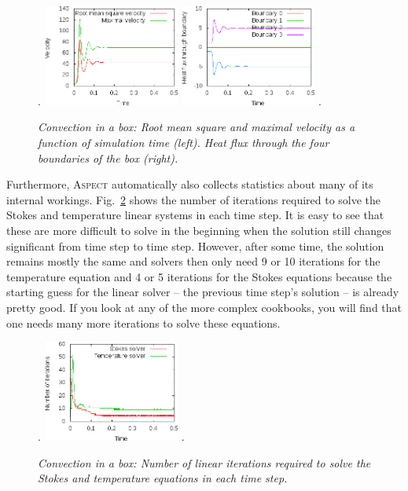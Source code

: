 \documentclass{article}
\newcommand{\aspect}{\textsc{Aspect}}
\begin{document}
\begin{figure}
\phantom.
\hfill
\includegraphics[width=0.4\textwidth]{cookbooks/convection-box/velocity}
\hfill
\includegraphics[width=0.4\textwidth]{cookbooks/convection-box/heatflux}
\hfill
\phantom.
\caption{\it Convection in a box: Root mean square and maximal velocity as a
function of simulation time (left). Heat flux through the four boundaries of
the box (right).}
\label{fig:convection-box-stats}
\end{figure}


Furthermore, \aspect{} automatically also collects statistics about many of its
internal workings. Fig.~\ref{fig:convection-box-iterations} shows the number of
iterations required to solve the Stokes and temperature linear systems in each
time step. It is easy to see that these are more difficult to solve in the
beginning when the solution still changes significant from time step to time
step. However, after some time, the solution remains mostly the same and solvers
then only need 9 or 10 iterations for the temperature equation and 4 or 5
iterations for the Stokes equations because the starting guess for the linear
solver -- the previous time step's solution -- is already pretty good. If you
look at any of the more complex cookbooks, you will find that one needs many
more iterations to solve these equations.

\begin{figure}
\phantom.
\hfill
\includegraphics[width=0.4\textwidth]{cookbooks/convection-box/iterations}
\hfill
\phantom.
\caption{\it Convection in a box: Number of linear iterations required to solve
the Stokes and temperature equations in each time step.}
\label{fig:convection-box-iterations}
\end{figure}
\end{document}
